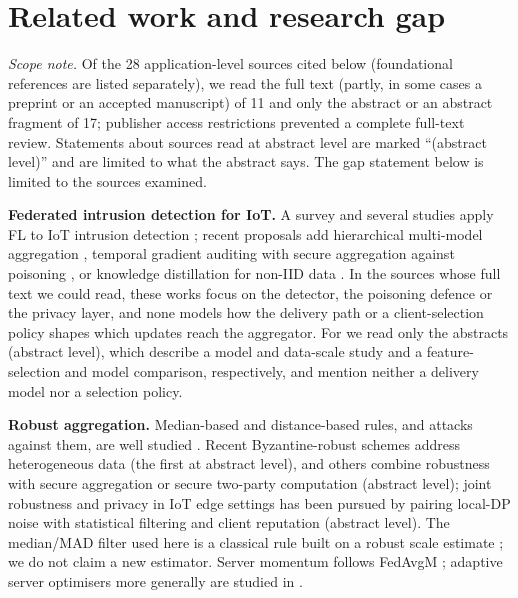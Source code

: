 \section{Related work and research gap}
\label{sec:related}
\emph{Scope note.} Of the 28 application-level sources cited below (foundational references are listed separately), we read the full text (partly, in some cases a preprint or an accepted manuscript) of 11 and only the abstract or an abstract fragment of 17; publisher access restrictions prevented a complete full-text review. Statements about sources read at abstract level are marked ``(abstract level)'' and are limited to what the abstract says. The gap statement below is limited to the sources examined.

\textbf{Federated intrusion detection for IoT.} A survey \cite{agrawal2022flids} and several studies apply FL to IoT intrusion detection \cite{albanbay2025ids,alghadi2025dos,peng2025fdids,rahmati2025cybersecurity,albogami2025deepfl}; recent proposals add hierarchical multi-model aggregation \cite{latif2026multimodel}, temporal gradient auditing with secure aggregation against poisoning \cite{soomro2026securedyn}, or knowledge distillation for non-IID data \cite{peng2025fdids}. In the sources whose full text we could read, these works focus on the detector, the poisoning defence or the privacy layer, and none models how the delivery path or a client-selection policy shapes which updates reach the aggregator. For \cite{albanbay2025ids,alghadi2025dos} we read only the abstracts (abstract level), which describe a model and data-scale study and a feature-selection and model comparison, respectively, and mention neither a delivery model nor a selection policy.

\textbf{Robust aggregation.} Median-based and distance-based rules, and attacks against them, are well studied \cite{blanchard2017krum,yin2018byzantine,fang2020local}. Recent Byzantine-robust schemes address heterogeneous data \cite{zhang2026malicious,zhu2026bpflh} (the first at abstract level), and others combine robustness with secure aggregation or secure two-party computation \cite{liu2026anonymous,shu2026trustworthy} (abstract level); joint robustness and privacy in IoT edge settings has been pursued by pairing local-DP noise with statistical filtering and client reputation \cite{s2dfl2026} (abstract level). The median/MAD filter used here is a classical rule built on a robust scale estimate \cite{rousseeuw1993mad}; we do not claim a new estimator. Server momentum follows FedAvgM \cite{hsu2019measuring}; adaptive server optimisers more generally are studied in \cite{reddi2021adaptive}.

